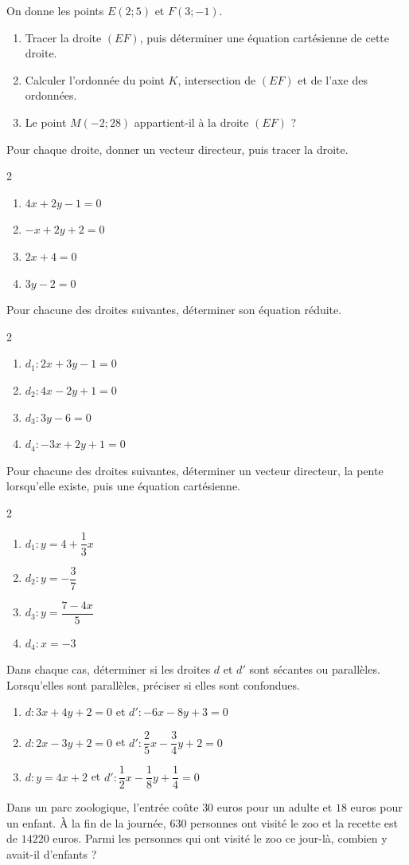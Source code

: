 \exo
On donne les points $E(2;5)$ et $F(3;-1)$.
\begin{enumerate}
\item Tracer la droite $(EF)$, puis déterminer une équation cartésienne de cette droite.
\item Calculer l'ordonnée du point $K$, intersection de $(EF)$ et de l'axe des ordonnées.
\item Le point $M(-2;28)$ appartient-il à la droite $(EF)$ ?
\end{enumerate}

\exo
Pour chaque droite, donner un vecteur directeur, puis tracer la droite.
\begin{multicols}{2}
\begin{enumerate}
\item $4x+2y-1=0$
\item $-x+2y+2=0$
\item $2x+4=0$
\item $3y-2=0$
\end{enumerate}
\end{multicols}
\exo
Pour chacune des droites suivantes, déterminer son équation réduite.
\begin{multicols}{2}
\begin{enumerate}
\item $d_1: 2x+3y-1=0$
\item $d_2: 4x-2y+1=0$
\item $d_3:3y-6=0$
\item $d_4 : -3x+2y+1=0$
\end{enumerate}
\end{multicols}

\exo
Pour chacune des droites suivantes, déterminer un vecteur directeur, la pente lorsqu'elle existe, puis une équation cartésienne.

\begin{multicols}{2}
\begin{enumerate}
\item $d_1: y=4+\dfrac{1}{3}x$
\item $d_2: y=-\dfrac{3}{7}$
\item $d_3: y=\dfrac{7-4x}{5}$
\item $d_4:  x=-3$ 
\end{enumerate}
\end{multicols}

\exo
Dans chaque cas, déterminer si les droites $d$ et $d'$ sont sécantes ou parallèles.
Lorsqu'elles sont parallèles, préciser si elles sont confondues.

\begin{enumerate}
\item $d : 3x+4y+2=0$ et $d' : -6x-8y+3=0$
\item $d : 2x-3y+2=0$ et $d' : \dfrac{2}{5}x-\dfrac{3}{4} y+2=0$
\item $d : y=4x+2$ et $d' : \dfrac{1}{2}x-\dfrac{1}{8}y+\dfrac{1}{4}=0$
\end{enumerate}

\exo
Dans un parc zoologique, l'entrée coûte $30$ euros pour un adulte et $18$ euros pour un enfant.
À la fin de la journée, $630$ personnes ont visité le zoo et la recette est de $14220$ euros.
Parmi les personnes qui ont visité le zoo ce jour-là, combien y avait-il d'enfants ?

